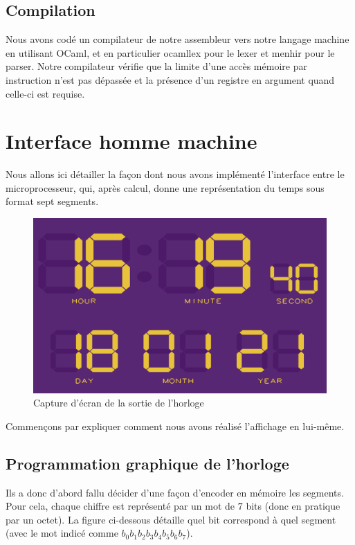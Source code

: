 \documentclass[10pt,a4paper,notitlepage ]{report}
\begin{document}
\subsection{Compilation}
	\par{Nous avons codé un compilateur de notre assembleur vers notre langage machine en utilisant OCaml, et en particulier ocamllex pour le lexer et menhir pour le parser. Notre compilateur vérifie que la limite d'une accès mémoire par instruction n'est pas dépassée et la présence d'un registre en argument quand celle-ci est requise.}


	\section{Interface homme machine}
	
	Nous allons ici détailler la façon dont nous avons implémenté l'interface entre le microprocesseur, qui, après calcul, donne une représentation du temps sous format sept segments.
	
	\begin{figure}[h]
		\centering
		\includegraphics[width=0.7\linewidth]{2021-01-18_16-19}
		\caption{Capture d'écran de la sortie de l'horloge}
		\label{fig:2021-01-1816-19}
	\end{figure}
	
	Commençons par expliquer comment nous avons réalisé l'affichage en lui-même.
	
	\subsection{Programmation graphique de l'horloge}
	
	Ils a donc d'abord fallu décider d'une façon d'encoder en mémoire les segments. Pour cela, chaque chiffre est représenté par un mot de $7$ bits (donc en pratique par un octet). La figure ci-dessous détaille quel bit correspond à quel segment (avec le mot indicé comme $b_0b_1b_2b_3b_4b_5b_6b_7$).
	
\end{document}
